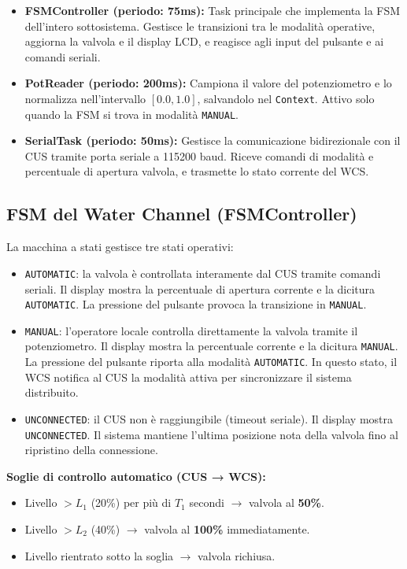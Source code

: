 \documentclass[12pt, a4paper]{article}
\begin{document}
\begin{itemize}
    \item \textbf{FSMController (periodo: 75ms):} Task principale che implementa la FSM dell'intero sottosistema. Gestisce le transizioni tra le modalità operative, aggiorna la valvola e il display LCD, e reagisce agli input del pulsante e ai comandi seriali.

    \item \textbf{PotReader (periodo: 200ms):} Campiona il valore del potenziometro e lo normalizza nell'intervallo $[0.0, 1.0]$, salvandolo nel \texttt{Context}. Attivo solo quando la FSM si trova in modalità \texttt{MANUAL}.

    \item \textbf{SerialTask (periodo: 50ms):} Gestisce la comunicazione bidirezionale con il CUS tramite porta seriale a 115200 baud. Riceve comandi di modalità e percentuale di apertura valvola, e trasmette lo stato corrente del WCS.
\end{itemize}

\subsection{FSM del Water Channel (FSMController)}

La macchina a stati gestisce tre stati operativi:

\begin{itemize}
    \item \texttt{AUTOMATIC}: la valvola è controllata interamente dal CUS tramite comandi seriali. Il display mostra la percentuale di apertura corrente e la dicitura \texttt{AUTOMATIC}. La pressione del pulsante provoca la transizione in \texttt{MANUAL}.

    \item \texttt{MANUAL}: l'operatore locale controlla direttamente la valvola tramite il potenziometro. Il display mostra la percentuale corrente e la dicitura \texttt{MANUAL}. La pressione del pulsante riporta alla modalità \texttt{AUTOMATIC}. In questo stato, il WCS notifica al CUS la modalità attiva per sincronizzare il sistema distribuito.

    \item \texttt{UNCONNECTED}: il CUS non è raggiungibile (timeout seriale). Il display mostra \texttt{UNCONNECTED}. Il sistema mantiene l'ultima posizione nota della valvola fino al ripristino della connessione.
\end{itemize}

\textbf{Soglie di controllo automatico (CUS → WCS):}
\begin{itemize}
    \item Livello $> L_1$ (20\%) per più di $T_1$ secondi $\rightarrow$ valvola al \textbf{50\%}.
    \item Livello $> L_2$ (40\%) $\rightarrow$ valvola al \textbf{100\%} immediatamente.
    \item Livello rientrato sotto la soglia $\rightarrow$ valvola richiusa.
\end{itemize}
\end{document}

